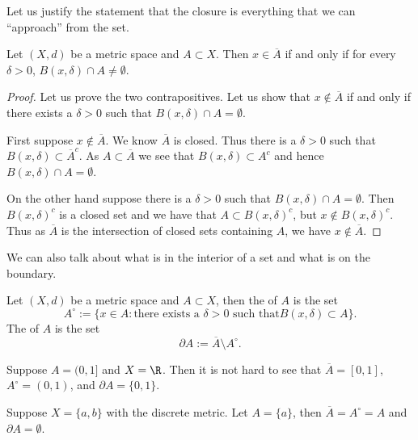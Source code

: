 \documentclass[12pt]{book}
\begin{document}
Let us justify the statement that the closure is everything that we can
``approach'' from the set.

\begin{prop} \label{prop:msclosureappr}
Let $(X,d)$ be a metric space and $A \subset X$.
Then $x \in \overline{A}$
if and only if for every $\delta > 0$, $B(x,\delta) \cap A \not=\emptyset$.
\end{prop}

\begin{proof}
Let us prove the two contrapositives.
Let us show that $x \notin \overline{A}$ if and only if there exists
a $\delta > 0$ such that $B(x,\delta) \cap A = \emptyset$.

First suppose $x \notin \overline{A}$.
We know $\overline{A}$ is
closed.
Thus there is a $\delta > 0$ such that
$B(x,\delta) \subset \overline{A}^c$.
As $A \subset \overline{A}$ we
see that $B(x,\delta) \subset A^c$ and hence
$B(x,\delta) \cap A = \emptyset$.

On the other hand suppose there is a $\delta > 0$ such that
$B(x,\delta) \cap A = \emptyset$.
Then ${B(x,\delta)}^c$ is a closed set and we have
that $A \subset {B(x,\delta)}^c$, but
$x \notin {B(x,\delta)}^c$.
Thus as $\overline{A}$ is the intersection
of closed sets containing $A$, we have $x \notin \overline{A}$.
\end{proof}

We can also talk about what is in the interior of a set and what is on the
boundary.

\begin{defn}
Let $(X,d)$ be a metric space and $A \subset X$, then
the \emph{} of $A$ is the set
\begin{equation*}
A^\circ := \{ x \in A : \text{there exists a $\delta > 0$ such that
$B(x,\delta) \subset A$} \} .
\end{equation*}
The \emph{} of $A$ is the set
\begin{equation*}
\partial A := \overline{A}\setminus A^\circ.
\end{equation*}
\end{defn}

\begin{example}
Suppose $A=(0,1]$ and $X = \R$.
Then it is not hard
to see that $\overline{A}=[0,1]$, $A^\circ = (0,1)$,
and $\partial A = \{ 0, 1 \}$.
\end{example}

\begin{example}
Suppose $X = \{ a, b \}$ with the discrete metric.
Let $A = \{ a \}$, then $\overline{A} = A^\circ = A$ and $\partial A =
\emptyset$.
\end{example}
\end{document}
